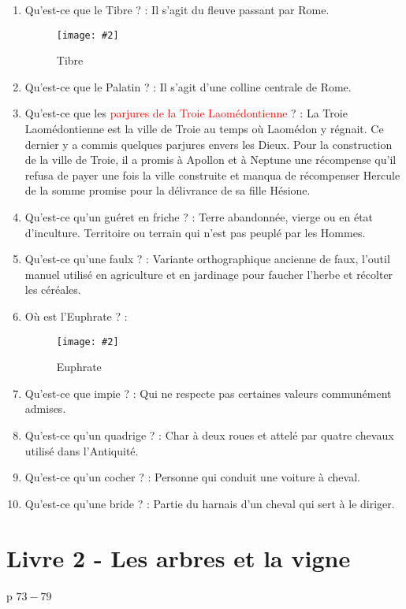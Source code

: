 \documentclass[a4paper, 11pt, hidelinks]{article}
\newcommand{\img}[4]{\begin{figure}[!ht]
    \centering
    \texttt{[image: \#2]}
    \caption{#3}
    \label{#4}
    \end{figure} }
\begin{document}
\begin{enumerate}
      \item Qu'est-ce que le Tibre ? : Il s'agit du fleuve passant par Rome.
            \img{0.5}{Tibre.jpg}{Tibre}{50} \newpage
      \item Qu'est-ce que le Palatin ? : Il s'agit d'une colline centrale de Rome.
      \item Qu'est-ce que les \textcolor{red}{parjures de la Troie Laomédontienne} ? : La Troie Laomédontienne est la ville de Troie au temps où Laomédon y régnait.
            Ce dernier y a commis quelques parjures envers les Dieux. Pour la construction de la ville de Troie, il a promis à Apollon et à Neptune une récompense
            qu'il refusa de payer une fois la ville construite et manqua de récompenser Hercule de la somme promise pour la délivrance de sa fille Hésione.
      \item Qu'est-ce qu'un guéret en friche ? : Terre abandonnée, vierge ou en état d'inculture. Territoire ou terrain qui n'est pas peuplé par les Hommes.
      \item Qu'est-ce qu'une faulx ? : Variante orthographique ancienne de faux, l'outil manuel utilisé en agriculture et en jardinage pour faucher l’herbe et récolter les céréales.
      \item Où est l'Euphrate ? : \img{0.5}{Euphrate.jpg}{Euphrate}{51}
      \item Qu'est-ce que impie ? : Qui ne respecte pas certaines valeurs communément admises.
      \item Qu'est-ce qu'un quadrige ? : Char à deux roues et attelé par quatre chevaux utilisé dans l'Antiquité.
      \item Qu'est-ce qu'un cocher ? : Personne qui conduit une voiture à cheval.
      \item Qu'est-ce qu'une bride ? : Partie du harnais d'un cheval qui sert à le diriger.
\end{enumerate}



\section{Livre 2 - Les arbres et la vigne}

p $73 - 79$
\end{document}

